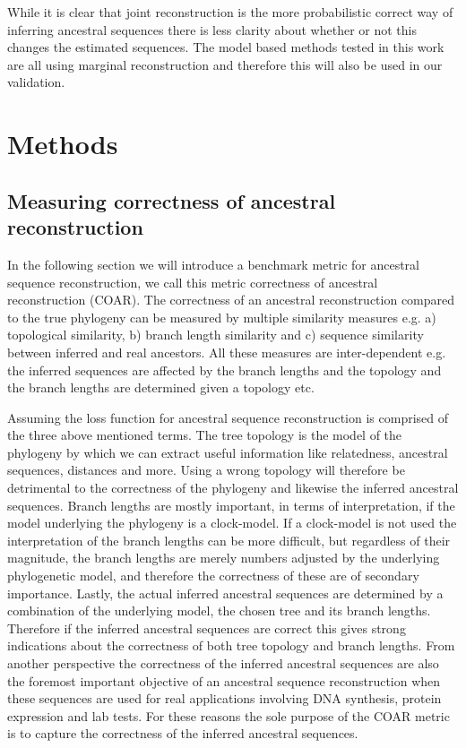 While it is clear that joint reconstruction is the more probabilistic correct way of inferring ancestral sequences there is less clarity about whether or not this changes the estimated sequences.
The model based methods tested in this work are all using marginal reconstruction and therefore this will also be used in our validation.






\section{Methods}

\subsection{Measuring correctness of ancestral reconstruction}
In the following section we will introduce a benchmark metric for ancestral sequence reconstruction, we call this metric correctness of ancestral reconstruction (COAR).
The correctness of an ancestral reconstruction compared to the true phylogeny can be measured by multiple similarity measures e.g. a) topological similarity, b) branch length similarity and c) sequence similarity between inferred and real ancestors.
All these measures are inter-dependent e.g. the inferred sequences are affected by the branch lengths and the topology and the branch lengths are determined given a topology etc.

Assuming the loss function for ancestral sequence reconstruction is comprised of the three above mentioned terms.
The tree topology is the model of the phylogeny by which we can extract useful information like relatedness, ancestral sequences, distances and more.
Using a wrong topology will therefore be detrimental to the correctness of the phylogeny and likewise the inferred ancestral sequences.
Branch lengths are mostly important, in terms of interpretation, if the model underlying the phylogeny is a clock-model.
If a clock-model is not used the interpretation of the branch lengths can be more difficult, but regardless of their magnitude, the branch lengths are merely numbers adjusted by the underlying phylogenetic model, and therefore the correctness of these are of secondary importance.
Lastly, the actual inferred ancestral sequences are determined by a combination of the underlying model, the chosen tree and its branch lengths.
Therefore if the inferred ancestral sequences are correct this gives strong indications about the correctness of both tree topology and branch lengths.
From another perspective the correctness of the inferred ancestral sequences are also the foremost important objective of an ancestral sequence reconstruction when these sequences are used for real applications involving DNA synthesis, protein expression and lab tests.
For these reasons the sole purpose of the COAR metric is to capture the correctness of the inferred ancestral sequences.

